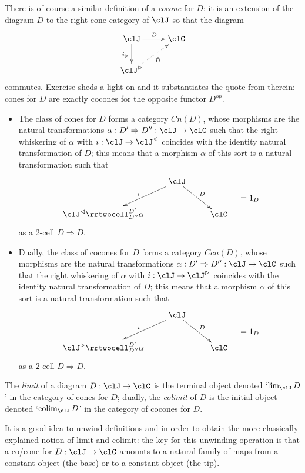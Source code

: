 \documentclass[11pt]{article}
\begin{document}
There is of course a similar definition of a \emph{cocone} for $D$: it is an extension of the diagram $D$ to the right cone category of $\clJ$ so that the diagram
\[
	\vcenter{\xymatrix{
			\clJ \ar[r]^D \ar[d]_{i_\rhd} & \clC \\
			\clJ^\rhd\ar@{.>}[ur]_{\bar D}
		}}
\]
commutes. Exercise  sheds a light on  and it substantiates the quote from \cite{acc} therein: cones for $D$ are exactly cocones for the opposite functor $D^{op}$.
\begin{remark}\leavevmode
	\begin{itemize}
		\item The class of cones for $D$ forms a category $Cn(D)$, whose morphisms are the natural transformations $\alpha : D'\Rightarrow D'' : \clJ \to \clC$ such that the right whiskering of $\alpha$ with $i : \clJ \to \clJ^\lhd$ coincides with the identity natural transformation of $D$; this means that a morphism $\alpha$ of this sort is a natural transformation such that
		      \[
			      \vcenter{\xymatrix{
					      &\clJ\ar[dl]_i\ar[dr]^D & \\
					      \clJ^\lhd \rrtwocell^{D'}_{D''}{\alpha}&& \clC
				      }}	\quad = 1_D
		      \]
		      as a 2-cell
		      $D\Rightarrow D$.	\item Dually, the class of cocones for $D$ forms a category $Ccn(D)$, whose morphisms are the natural transformations $\alpha : D'\Rightarrow D'' : \clJ \to \clC$ such that the right whiskering of $\alpha$ with $i : \clJ \to \clJ^\rhd$ coincides with the identity natural transformation of $D$; this means that a morphism $\alpha$ of this sort is a natural transformation such that
		      \[
			      \vcenter{\xymatrix{
					      &\clJ\ar[dl]_i\ar[dr]^D & \\
					      \clJ^\rhd \rrtwocell^{D'}_{D''}{\alpha}&& \clC
				      }}	\quad = 1_D
		      \]
		      as a 2-cell $D\Rightarrow D$.
	\end{itemize}
\end{remark}
\begin{definition}
	The \emph{limit} of a diagram $D : \clJ\to \clC$ is the terminal object denoted `$\lim_\clJ D$' in the category of cones for $D$; dually, the \emph{colimit} of $D$ is the initial object denoted `$\colim_\clJ D$' in the category of cocones for $D$.
\end{definition}
It is a good idea to unwind definitions  and  in order to obtain the more classically explained notion of limit and colimit: the key for this unwinding operation is that a co/cone for $D : \clJ \to \clC$ amounts to a natural family of maps from a constant object (the base) or to a constant object (the tip).
\end{document}
